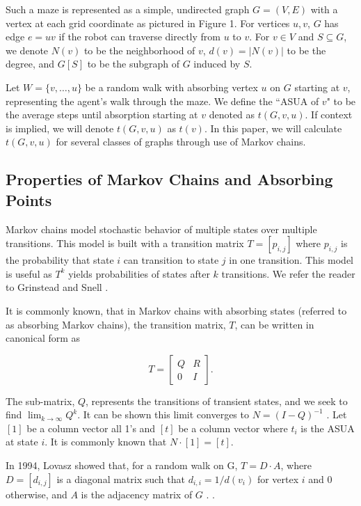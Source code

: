 \documentclass{article}
\theoremstyle{definition}
\begin{document}
\par Such a maze is represented as a simple, undirected graph $G = (V,E)$ with a vertex at each grid coordinate as pictured in Figure 1. For vertices $u, v$, $G$ has edge $e =uv$ if the robot can traverse directly from $u$ to $v$. For $v \in V$ and $S \subseteq G$,  we denote $N(v)$ to be the neighborhood of $v$, $d(v) = |N(v)|$ to be the degree, and $G[S]$ to be the subgraph of $G$ induced by $S$.

\par Let $W = \{v,\ldots,u\}$ be a random walk with absorbing vertex $u$ on $G$ starting at $v$, representing the agent's walk through the maze. We define the ``ASUA of $v$" to be the average steps until absorption starting at $v$ denoted as $t(G,v,u)$. If context is implied, we will denote $t(G,v,u)$ as $t(v)$. In this paper, we will calculate $t(G,v,u)$ for several classes of graphs through use of Markov chains.

\subsection{Properties of Markov Chains and Absorbing Points}

Markov chains model stochastic behavior of multiple states over multiple transitions. This model is built with a transition matrix $T = [p_{i,j}]$ where $p_{i,j}$ is the probability that state $i$ can transition to state $j$ in one transition. This model is useful as $T^k$ yields probabilities of states after $k$ transitions. We refer the reader to Grinstead and Snell \cite{grinstead}.

It is commonly known, that in Markov chains with absorbing states (referred to as absorbing Markov chains), the transition matrix, $T$, can be written in canonical form as

\[
T = 
\begin{bmatrix}
  Q & R \\
  0 & I
\end{bmatrix}.
\]

The sub-matrix, $Q$, represents the transitions of transient states, and we seek to find $\lim_{k \rightarrow \infty}Q^k$. It can be shown this limit converges to $N = (I - Q)^{-1}$ \cite{cheteyan}. Let $[1]$ be a column vector all 1's and $[t]$ be a column vector where $t_i$ is the ASUA at state $i$. It is commonly known that $N \cdot [1] = [t]$.

In 1994, Lovasz showed that, for a random walk on G, $T = D \cdot A$, where $D = [d_{i,j}]$ is a diagonal matrix such that $d_{i,i} = 1/d(v_i)$ for vertex $i$ and 0 otherwise, and $A$ is the adjacency matrix of $G$ \cite{lovasz}. . 
\end{document}
